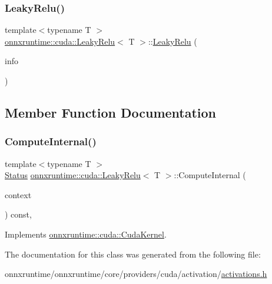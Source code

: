 \subsubsection{\texorpdfstring{Leaky\+Relu()}{LeakyRelu()}}
{\footnotesize\ttfamily template$<$typename T $>$ \\
\mbox{\hyperlink{classonnxruntime_1_1cuda_1_1LeakyRelu}{onnxruntime\+::cuda\+::\+Leaky\+Relu}}$<$ T $>$\+::\mbox{\hyperlink{classonnxruntime_1_1cuda_1_1LeakyRelu}{Leaky\+Relu}} (\begin{DoxyParamCaption}\item[{const \mbox{\hyperlink{classonnxruntime_1_1OpKernelInfo}{Op\+Kernel\+Info}} \&}]{info }\end{DoxyParamCaption})\hspace{0.3cm}{\ttfamily [inline]}}



\subsection{Member Function Documentation}
\mbox{\label{classonnxruntime_1_1cuda_1_1LeakyRelu_ab643554299b83ba95f722bd92193f2a4}} 
\subsubsection{\texorpdfstring{Compute\+Internal()}{ComputeInternal()}}
{\footnotesize\ttfamily template$<$typename T $>$ \\
\mbox{\hyperlink{classonnxruntime_1_1common_1_1Status}{Status}} \mbox{\hyperlink{classonnxruntime_1_1cuda_1_1LeakyRelu}{onnxruntime\+::cuda\+::\+Leaky\+Relu}}$<$ T $>$\+::Compute\+Internal (\begin{DoxyParamCaption}\item[{\mbox{\hyperlink{classonnxruntime_1_1OpKernelContext}{Op\+Kernel\+Context}} $\ast$}]{context }\end{DoxyParamCaption}) const\hspace{0.3cm}{\ttfamily [override]}, {\ttfamily [virtual]}}



Implements \mbox{\hyperlink{classonnxruntime_1_1cuda_1_1CudaKernel_aca7af04ae448017d6023d30bba231ebb}{onnxruntime\+::cuda\+::\+Cuda\+Kernel}}.



The documentation for this class was generated from the following file\+:\begin{DoxyCompactItemize}
\item 
onnxruntime/onnxruntime/core/providers/cuda/activation/\mbox{\hyperlink{cuda_2activation_2activations_8h}{activations.\+h}}\end{DoxyCompactItemize}
